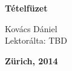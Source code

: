 
\thispagestyle{empty}
\renewcommand{\baselinestretch}{1.3}\normalsize

\vspace*{6.5cm}

\begin{center}
  \par {\LARGE\bfseries T\'{e}telf\"{u}zet}
\end{center}

\vspace*{1em}

\begin{center}
Kov\'{a}cs D\'{a}niel\\
Lektor\'{a}lta: TBD
\end{center}


\begin{center}
  {\Large\bfseries Z\"{u}rich, 2014}
	
  {\Large\cc\byncsa}
\end{center}
\cleardoublepage
